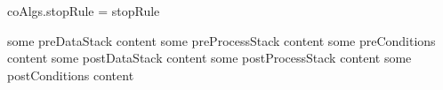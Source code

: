 coAlgs.stopRule = stopRule
\stopLuaCode

\startConTest
  \startRule[testRule]
    \preDataStack
      some preDataStack content
    \preProcessStack
      some preProcessStack content
    \preConditions
      some preConditions content
    \postDataStack
      some postDataStack content
    \postProcessStack
      some postProcessStack content
    \postConditions  
      some postConditions content
  \stopRule
\stopConTest
\stopTestCase
\stopTestSuite